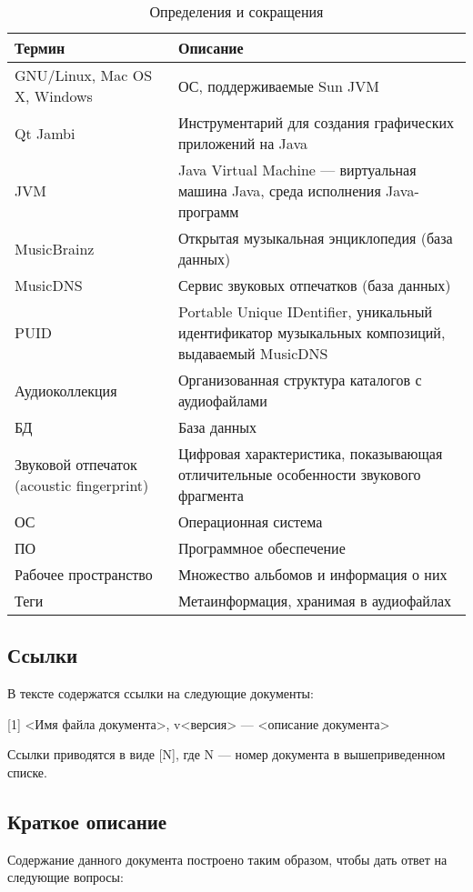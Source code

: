 \documentclass[pdftex,12pt,a4paper]{report}
\begin{document}
\begin{table}[h]
\captionsetup{justification=raggedright, singlelinecheck=false}
\caption{Определения и сокращения}
\begin{tabular}{|p{4cm}|p{10cm}|} \hline
\rowcolor[gray]{0.9} Термин & Описание \\ \hline
GNU/Linux, Mac OS X, Windows & ОС, поддерживаемые Sun JVM \\ \hline
Qt Jambi & Инструментарий для создания графических приложений на Java \\ \hline
JVM & Java Virtual Machine --- виртуальная машина Java, среда исполнения Java-программ \\ \hline
MusicBrainz & Открытая музыкальная энциклопедия (база данных) \\ \hline
MusicDNS    & Сервис звуковых отпечатков (база данных) \\ \hline
PUID & Portable Unique IDentifier, уникальный идентификатор музыкальных композиций, выдаваемый MusicDNS \\ \hline
Аудиоколлекция & Организованная структура каталогов с аудиофайлами \\ \hline
БД & База данных \\ \hline
Звуковой отпечаток (acoustic fingerprint) & Цифровая характеристика, показывающая отличительные особенности звукового фрагмента \\ \hline
ОС & Операционная система \\ \hline
ПО & Программное обеспечение \\ \hline
Рабочее пространство & Множество альбомов и информация о них \\ \hline
Теги & Метаинформация, хранимая в аудиофайлах \\ \hline
\end{tabular}
\end{table}

\subsection{Ссылки}
В тексте содержатся ссылки на следующие документы:

[1]	<Имя файла документа>, v<версия> --- <описание документа>

Ссылки приводятся в виде [N], где N --- номер документа в вышеприведенном списке.

\subsection{Краткое описание}
Содержание данного документа построено таким образом, чтобы дать ответ на следующие вопросы:
\end{document}
